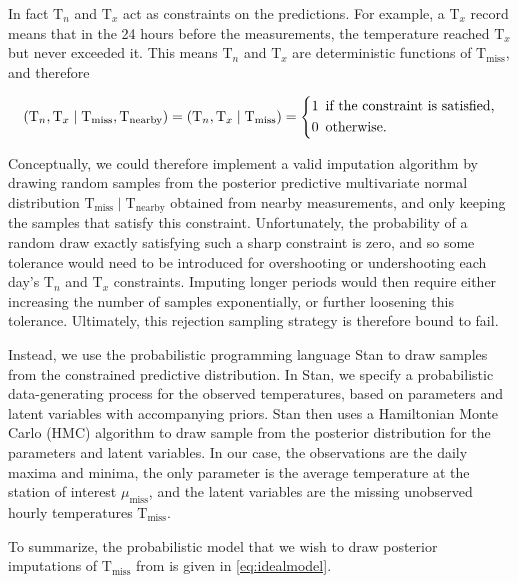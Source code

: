 \documentclass[letter]{article}
\newcommand{\genericdel}[3]{%
      \left#1#3\right#2
    }
\newcommand{\del}[1]{\genericdel(){#1}}
\let\Pr\relax
\DeclareMathOperator{\Pr}{\mathbb{P}}
\newcommand{\T}{\mathrm{T}}
\newcommand{\Tn}{\T_{n}}
\newcommand{\Tx}{\T_{x}}
\newcommand{\miss}{\mathrm{miss}}
\newcommand{\obs}{\mathrm{nearby}}
\begin{document}
In fact \(\Tn\) and \(\Tx\) act as constraints on the predictions. For
example, a \(\Tx\) record means that in the 24 hours before the
measurements, the temperature reached \(\Tx\) but never exceeded it.
This means \(\Tn\) and \(\Tx\) are deterministic functions of
\(\T_\miss\), and therefore

\begin{equation}
\Pr\del{\Tn, \Tx \mid \T_\miss, \T_\obs} = \Pr\del{\Tn, \Tx \mid \T_\miss} = \left\{
\begin{split}
    1 & \,\text{ if the constraint is satisfied,} \\
    0 & \,\text{ otherwise.}
\end{split}
\right.
\end{equation}
    


    	Conceptually, we could therefore implement a valid imputation algorithm
by drawing random samples from the posterior predictive multivariate
normal distribution \(\T_\miss \mid \T_\obs\) obtained from nearby
measurements, and only keeping the samples that satisfy this constraint.
Unfortunately, the probability of a random draw exactly satisfying such
a sharp constraint is zero, and so some tolerance would need to be
introduced for overshooting or undershooting each day's \(\Tn\) and
\(\Tx\) constraints. Imputing longer periods would then require either
increasing the number of samples exponentially, or further loosening
this tolerance. Ultimately, this rejection sampling strategy is
therefore bound to fail.

Instead, we use the probabilistic programming language Stan to draw
samples from the constrained predictive distribution. In Stan, we
specify a probabilistic data-generating process for the observed
temperatures, based on parameters and latent variables with accompanying
priors. Stan then uses a Hamiltonian Monte Carlo (HMC) algorithm to draw
sample from the posterior distribution for the parameters and latent
variables. In our case, the observations are the daily maxima and
minima, the only parameter is the average temperature at the station of
interest \(\mu_\miss\), and the latent variables are the missing
unobserved hourly temperatures \(\T_\miss\).
    


    	To summarize, the probabilistic model that we wish to draw posterior
imputations of \(\T_\miss\) from is given in \eqref{eq:idealmodel}.
\end{document}
